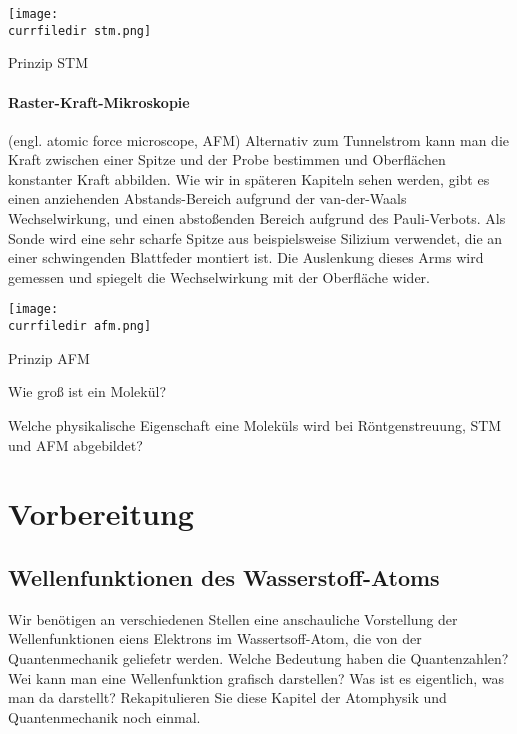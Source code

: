 \begin{marginfigure}
\texttt{[image: \\currfiledir stm.png]}
\caption{Prinzip STM}
\end{marginfigure}


\paragraph{Raster-Kraft-Mikroskopie} (engl. atomic force microscope, AFM) Alternativ zum Tunnelstrom kann man die Kraft zwischen einer Spitze und der Probe bestimmen und Oberflächen konstanter Kraft abbilden. Wie wir in späteren Kapiteln sehen werden, gibt es einen anziehenden Abstands-Bereich aufgrund der van-der-Waals Wechselwirkung, und einen abstoßenden Bereich aufgrund des Pauli-Verbots. Als Sonde wird eine sehr scharfe Spitze aus beispielsweise Silizium verwendet, die an einer schwingenden Blattfeder montiert ist. Die Auslenkung dieses Arms wird gemessen und spiegelt die Wechselwirkung mit der Oberfläche wider.


\begin{marginfigure}
\texttt{[image: \\currfiledir afm.png]}
\caption{Prinzip AFM}
\end{marginfigure}

 
\begin{questions} 
\item Wie groß ist ein Molekül?
\item Welche physikalische Eigenschaft eine Moleküls wird bei Röntgenstreuung, STM und AFM abgebildet?
\end{questions}
 
 
\section{Vorbereitung}


\subsection{Wellenfunktionen des Wasserstoff-Atoms}

Wir benötigen an verschiedenen Stellen eine anschauliche Vorstellung der Wellenfunktionen eiens Elektrons im Wassertsoff-Atom, die von  der Quantenmechanik geliefetr werden. Welche Bedeutung haben die Quantenzahlen? Wei kann man eine Wellenfunktion grafisch darstellen? Was ist es eigentlich, was man da darstellt? Rekapitulieren Sie diese Kapitel der Atomphysik und Quantenmechanik noch einmal.



